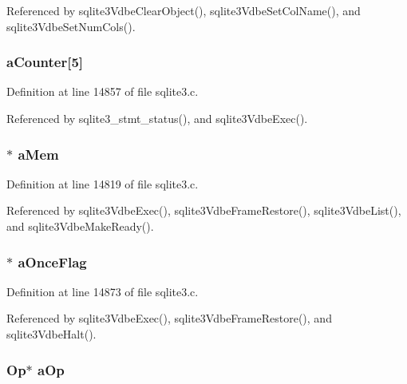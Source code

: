 Referenced by sqlite3\+Vdbe\+Clear\+Object(), sqlite3\+Vdbe\+Set\+Col\+Name(), and sqlite3\+Vdbe\+Set\+Num\+Cols().

\hypertarget{struct_vdbe_a6adeb61820e6d85f4d030270dba855fe}{}
\subsubsection[{a\+Counter}]{ a\+Counter\mbox{[}5\mbox{]}}\label{struct_vdbe_a6adeb61820e6d85f4d030270dba855fe}


Definition at line 14857 of file sqlite3.\+c.



Referenced by sqlite3\+\_\+stmt\+\_\+status(), and sqlite3\+Vdbe\+Exec().

\hypertarget{struct_vdbe_adfd56f8b1cc1790601ff0940d884c200}{}
\subsubsection[{a\+Mem}]{$\ast$ a\+Mem}\label{struct_vdbe_adfd56f8b1cc1790601ff0940d884c200}


Definition at line 14819 of file sqlite3.\+c.



Referenced by sqlite3\+Vdbe\+Exec(), sqlite3\+Vdbe\+Frame\+Restore(), sqlite3\+Vdbe\+List(), and sqlite3\+Vdbe\+Make\+Ready().

\hypertarget{struct_vdbe_ae7256911c06e37eb7d9e0ab9bb9df93e}{}
\subsubsection[{a\+Once\+Flag}]{$\ast$ a\+Once\+Flag}\label{struct_vdbe_ae7256911c06e37eb7d9e0ab9bb9df93e}


Definition at line 14873 of file sqlite3.\+c.



Referenced by sqlite3\+Vdbe\+Exec(), sqlite3\+Vdbe\+Frame\+Restore(), and sqlite3\+Vdbe\+Halt().

\hypertarget{struct_vdbe_a174225cf156b2753600dd11eefc2c992}{}
\subsubsection[{a\+Op}]{\setlength{\rightskip}{0pt plus 5cm}Op$\ast$ a\+Op}\label{struct_vdbe_a174225cf156b2753600dd11eefc2c992}


